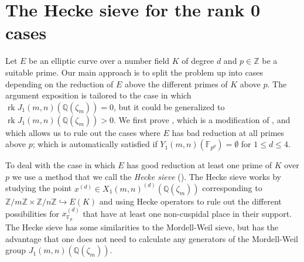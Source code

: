 \documentclass[11pt,reqno]{amsart}
\DeclareMathOperator{\rk}{rk}
\theoremstyle{definition}
\numberwithin{equation}{section}
\newcommand{\Q}{\mathbb{Q}}
\newcommand{\Z}{\mathbb{Z}}
\newcommand{\F}{\mathbb{F}}
\def\tg#1#2{\mathbb Z/#1\mathbb Z \times \mathbb Z /#2 \mathbb Z}
\begin{document}
\section{The Hecke sieve for the rank 0 cases} \label{sec:rank0}
Let $E$ be an elliptic curve over a number field $K$ of degree $d$ and $p \in \Z$ be a suitable prime. Our main approach is to split the problem up into cases depending on the reduction of $E$ above the different primes of $K$ above $p$. The argument exposition is tailored to the case in which $\rk J_1(m,n)(\Q(\zeta_m))=0$, but it could be generalized to $\rk J_1(m,n)(\Q(\zeta_m))>0$. We first prove , which is a modification of \cite[Theorem 1]{bruin_najman2016}, and which allows us to rule out the cases where $E$ has bad reduction at all primes above $p$; which is automatically satisfied if $Y_1(m,n)(\F_{p^d})=\emptyset$ for $1\leq d \leq 4.$  

To deal with the case in which $E$ has good reduction at least one prime of $K$ over $p$ we use a method that we call the \textit{Hecke sieve} (). The Hecke sieve works by studying the point $x^{(d)} \in X_1(m,n)^{(d)}(\Q(\zeta_m))$ corresponding to $\tg{m}{n} \hookrightarrow E(K)$ and using Hecke operators to rule out the different possibilities for $x^{(d)}_{\F_p}$ that have at least one non-cuspidal place in their support. The Hecke sieve has some similarities to the Mordell-Weil sieve, but has the advantage that one does not need to calculate any generators of the Mordell-Weil group $J_1(m,n)(\Q(\zeta_m))$.
\end{document}
